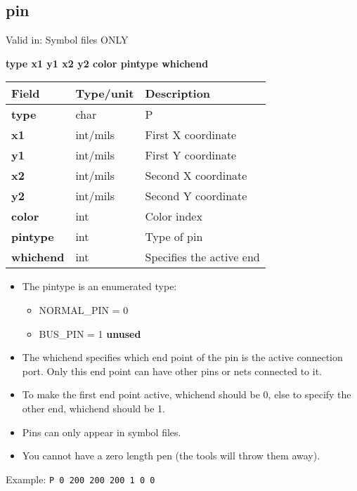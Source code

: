 \documentclass{article}
\begin{document}
\subsection{pin}

Valid in: Symbol files ONLY

{\bf type x1 y1 x2 y2 color pintype whichend}

\begin{table}[h]
\begin{tabular}{|l|l|l|} \hline
Field 		& Type/unit 	& Description \\ \hline 
\hline
{\bf type} 	& char		& P \\ \hline
{\bf x1} 	& int/mils	& First X coordinate \\ \hline
{\bf y1} 	& int/mils	& First Y coordinate \\ \hline
{\bf x2} 	& int/mils	& Second X coordinate \\ \hline
{\bf y2} 	& int/mils	& Second Y coordinate \\ \hline
{\bf color} 	& int		& Color index \\ \hline
{\bf pintype} 	& int		& Type of pin \\ \hline
{\bf whichend} 	& int		& Specifies the active end \\ \hline
\end{tabular}
\end{table}

\begin{itemize}
\item The pintype is an enumerated type:
\begin{itemize}
\item NORMAL\_PIN = 0
\item BUS\_PIN = 1 {\bf unused}
\end{itemize}
\item The whichend specifies which end point of the pin is the active 
      connection port.  Only this end point can have other pins or nets 
      connected to it.
\item To make the first end point active, whichend should be 0, else to
      specify the other end, whichend should be 1.
\item Pins can only appear in symbol files.
\item You cannot have a zero length pen (the tools will throw them away).
\end{itemize}

Example:\newline
{\tt P 0 200 200 200 1 0 0}
\end{document}

